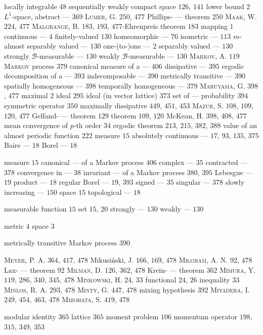locally integrable $48$ sequentially weakly compact space $126$, $141$ lower bound $2$ $L^1$-space, abstract --- $369$ \textsc{Lumer}, G. $250$, $477$ Phillips- --- theorem $250$ \textsc{Maak}, W. $224$, $477$ \textsc{Malgrange}, B. $183$, $193$, $477$-Ehrenpreis theorem $183$ mapping $1$ continuous --- $4$ finitely-valued $130$ homeomorphic --- $76$ isometric --- $113$ $m$-almost separably valued --- $130$ one-(to-)one --- $2$ separably valued --- $130$ strongly $\mathcal{B}$-measurable --- $130$ weakly $\mathcal{B}$-measurable --- $130$ \textsc{Markov}, A. $119$ \textsc{Markov} process $379$ canonical measure of a --- $406$ dissipative --- $395$ ergodic decomposition of a --- $393$ indecomposable --- $390$ metrically transitive --- $390$ spatially homogeneous --- $398$ temporally homogeneous --- $379$ \textsc{Maruyama}, G. $398$, $477$ maximal $2$ ideal $295$ ideal (in vector lattice) $373$ set of --- probability $394$ symmetric operator $350$ maximally dissipative $449$, $451$, $453$ \textsc{Mazur}, S. $108$, $109$, $120$, $477$ Gelfand- --- theorem $129$ theorem $109$, $120$ McKean, H. $398$, $408$, $477$ mean convergence of $p$-th order $34$ ergodic theorem $213$, $215$, $382$, $388$ value of an almost periodic function $222$ measure $15$ absolutely continuous --- $17$, $93$, $135$, $375$ Baire --- $18$ Borel --- $18$ 

measure $15$ canonical --- of a Markov process $406$ complex --- $35$ contracted --- $378$ convergence in --- $38$ invariant --- of a Markov process $380$, $395$ Lebesgue --- $19$ product --- $18$ regular Borel --- $19$, $393$ signed --- $35$ singular --- $378$ slowly increasing --- $150$ space $15$ topological --- $18$

measurable function $15$ set $15$, $20$ strongly --- $130$ weakly --- $130$

metric $4$ space $3$

metrically transitive Markov process $390$

\textsc{Meyer}, P. A. $364$, $417$, $478$ Mikusiński, J. $166$, $169$, $478$ \textsc{Milgram}, A. N. $92$, $478$ Lax- --- theorem $92$ \textsc{Milman}, D. $126$, $362$, $478$ Krein- --- theorem $362$ \textsc{Mimura}, Y. $119$, $286$, $340$, $345$, $478$ \textsc{Minkowski}, H. $24$, $33$ functional $24$, $26$ inequality $33$ \textsc{Minlos}, R. A. $293$, $478$ \textsc{Minty}, G. $447$, $478$ mixing hypothesis $392$ \textsc{Miyadera}, I. $249$, $454$, $463$, $478$ \textsc{Mizohata}, S. $419$, $478$

modular identity $365$ lattice $365$ moment problem $106$ momentum operator $198$, $315$, $349$, $353$

